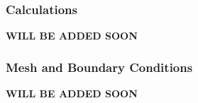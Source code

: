 \subsubsection{Calculations}
\textbf{WILL BE ADDED SOON}
\subsubsection{Mesh and Boundary Conditions}
\textbf{WILL BE ADDED SOON}

